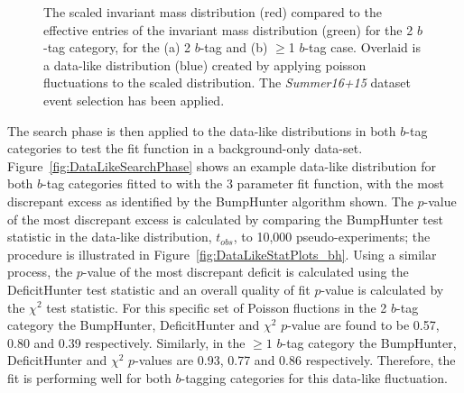 \begin{figure}[!ht]
  \begin{center}
   \captionsetup[subfigure]{aboveskip=0pt,justification=centering}
  \end{center}
  \caption{The scaled invariant mass distribution (red) compared to the
    effective entries of the invariant mass distribution (green) for the 2 $b$-tag category,
    for the (a) 2 $b$-tag and (b) $\geq$1 $b$-tag case.
    Overlaid is a data-like distribution (blue) created by applying poisson fluctuations to the scaled distribution.
    The \textit{Summer16+15} dataset event selection has been applied.}
  \label{fig:effEntDataLike}
\end{figure}

The search phase is then applied to the data-like distributions
in both $b$-tag categories 
to test the fit function in a background-only data-set.
Figure~\ref{fig:DataLikeSearchPhase} shows an example data-like distribution for both $b$-tag categories fitted
to with the 3 parameter fit function,
with the most discrepant excess as identified by the BumpHunter algorithm shown.
The $p$-value of the most discrepant excess is calculated by comparing the BumpHunter test statistic in the data-like distribution, $t_{obs}$,
to 10,000 pseudo-experiments; the procedure is illustrated in Figure~\ref{fig:DataLikeStatPlots_bh}.
Using a similar process, the $p$-value of the most discrepant deficit is calculated using the DeficitHunter test statistic
and an overall quality of fit $p$-value is calculated by the $\chi^{2}$ test statistic.
For this specific set of Poisson fluctions in the 2 $b$-tag category
the BumpHunter, DeficitHunter and  $\chi^{2}$ $p$-value are found to be
0.57, 0.80 and 0.39 respectively.
Similarly, in the $\geq1$ $b$-tag category the
BumpHunter, DeficitHunter and  $\chi^{2}$ $p$-values are
0.93, 0.77 and 0.86 respectively.
Therefore, the fit is performing well for both $b$-tagging categories for this data-like fluctuation.

